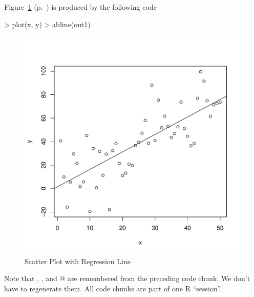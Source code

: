 \documentclass{article}
\begin{document}
Figure~\ref{fig:one} (p.~\pageref{fig:one})
is produced by the following code
\begin{Schunk}
\begin{Sinput}
> plot(x, y)
> abline(out1)
\end{Sinput}
\end{Schunk}
\begin{figure}
\begin{center}
\includegraphics{foo-fig1}
\end{center}
\caption{Scatter Plot with Regression Line}
\label{fig:one}
\end{figure}
Note that \verb@x@, \verb@y@, and @ are remembered from
the preceding code chunk.  We don't have to regenerate them.
All code chunks are part of one R ``session''.
\end{document}
